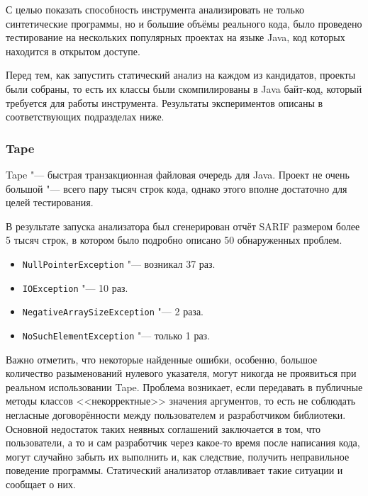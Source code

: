 С целью показать способность инструмента анализировать не только синтетические программы, но и большие объёмы реального кода, было проведено тестирование на нескольких популярных проектах на языке Java, код которых находится в открытом доступе.

Перед тем, как запустить статический анализ на каждом из кандидатов, проекты были собраны, то есть их классы были скомпилированы в Java байт-код, который требуется для работы инструмента. Результаты экспериментов описаны в соответствующих подразделах ниже.

\subsubsection{Tape}

Tape \cite{tape} "--- быстрая транзакционная файловая очередь для Java. Проект не очень большой "--- всего пару тысяч строк кода, однако этого вполне достаточно для целей тестирования.

В результате запуска анализатора был сгенерирован отчёт SARIF размером более 5 тысяч строк, в котором было подробно описано 50 обнаруженных проблем.

\begin{itemize}
    \item \verb|NullPointerException| "--- возникал 37 раз.
    \item \verb|IOException| "--- 10 раз.
    \item \verb|NegativeArraySizeException| "--- 2 раза.
    \item \verb|NoSuchElementException| "--- только 1 раз.
\end{itemize}

Важно отметить, что некоторые найденные ошибки, особенно, большое количество разыменований нулевого указателя, могут никогда не проявиться при реальном использовании Tape. Проблема возникает, если передавать в публичные методы классов <<некорректные>> значения аргументов, то есть не соблюдать негласные договорённости между пользователем и разработчиком библиотеки. Основной недостаток таких неявных соглашений заключается в том, что пользователи, а то и сам разработчик через какое-то время после написания кода, могут случайно забыть их выполнить и, как следствие, получить неправильное поведение программы. Статический анализатор отлавливает такие ситуации и сообщает о них.

